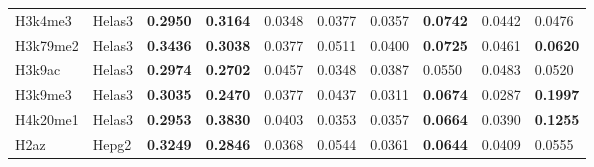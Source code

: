 \begin{table}[!ht]
\begin{tabular}{ll|ll|ll|ll|ll}
H3k4me3                              & Helas3                                 & {\color[HTML]{CB0000} \textbf{0.2950}}                       & {\color[HTML]{CB0000} \textbf{0.3164}}                      & 0.0348                                & 0.0377                               & 0.0357                                & \textbf{0.0742}                        & 0.0442                                & 0.0476                                 \\
H3k79me2                             & Helas3                                 & {\color[HTML]{CB0000} \textbf{0.3436}}                       & {\color[HTML]{CB0000} \textbf{0.3038}}                      & 0.0377                                & 0.0511                               & 0.0400                                & \textbf{0.0725}                        & 0.0461                                & \textbf{0.0620}                        \\
H3k9ac                               & Helas3                                 & {\color[HTML]{CB0000} \textbf{0.2974}}                       & {\color[HTML]{CB0000} \textbf{0.2702}}                      & 0.0457                                & 0.0348                               & 0.0387                                & 0.0550                                 & 0.0483                                & 0.0520                                 \\
H3k9me3                              & Helas3                                 & {\color[HTML]{CB0000} \textbf{0.3035}}                       & {\color[HTML]{CB0000} \textbf{0.2470}}                      & 0.0377                                & 0.0437                               & 0.0311                                & \textbf{0.0674}                        & 0.0287                                & {\color[HTML]{CB0000} \textbf{0.1997}} \\
H4k20me1                             & Helas3                                 & {\color[HTML]{CB0000} \textbf{0.2953}}                       & {\color[HTML]{CB0000} \textbf{0.3830}}                      & 0.0403                                & 0.0353                               & 0.0357                                & \textbf{0.0664}                        & 0.0390                                & {\color[HTML]{CB0000} \textbf{0.1255}} \\
H2az                                 & Hepg2                                  & {\color[HTML]{CB0000} \textbf{0.3249}}                       & {\color[HTML]{CB0000} \textbf{0.2846}}                      & 0.0368                                & 0.0544                               & 0.0361                                & \textbf{0.0644}                        & 0.0409                                & 0.0555                                 \\

\end{tabular}
\end{table}
